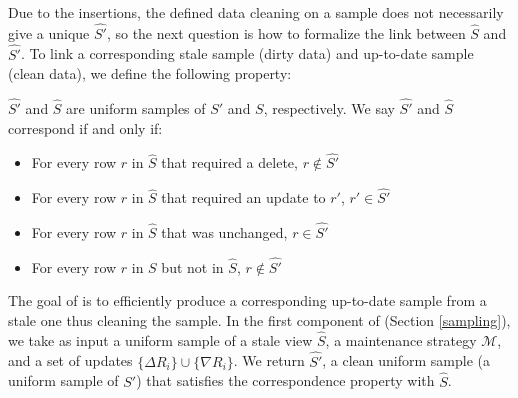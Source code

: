 Due to the insertions, the defined data cleaning on a sample does not necessarily give a unique $\hat{S'}$, so the next question is how to formalize the link between $\hat{S}$ and $\hat{S'}$. 
To link a corresponding stale sample (dirty data) and up-to-date sample (clean data), we define the following property:
\begin{definition}[Correspondence]
$\hat{S'}$ and $\hat{S}$ are uniform samples of $S'$ and $S$, respectively.  We say $\hat{S'}$ and $\hat{S}$ correspond if and only if:
\vspace{-.25em}
\begin{itemize}[noitemsep]
\item For every row $r$ in $\hat{S}$ that required a delete, $r \not\in \hat{S'}$
\item For every row $r$ in $\hat{S}$ that required an update to $r'$, $r' \in \hat{S'}$
\item For every row $r$ in $\hat{S}$  that was unchanged, $r \in \hat{S'}$
\item For every row $r$ in $S$ but not in $\hat{S}$, $r \not\in \hat{S'}$
\end{itemize}
\vspace{-.25em}
\label{correspondence}
\end{definition}

The goal of \svc is to efficiently produce a corresponding up-to-date sample from a stale one thus cleaning the sample.
In the first component of \svc (Section \ref{sampling}), we take as input a uniform sample of a stale view $\hat{S}$, a maintenance strategy $\mathcal{M}$, and a set of updates $\{\Delta R_i\} \cup \{\nabla R_i\}$.
We return $\hat{S'}$, a clean uniform sample (a uniform sample of $S'$) that satisfies the correspondence property with $\hat{S}$.

